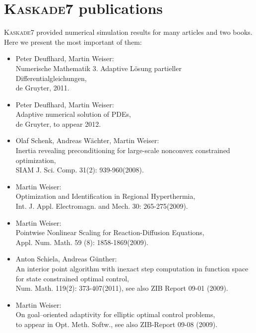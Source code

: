 \documentclass[11pt]{article}
\newcommand{\K}{\textsc{Kaskade7 }}
\begin{document}
\section{\K publications} \label{pubs}
\K provided numerical simulation results for  many  articles and  two books.
Here we present the most important of them:

\begin{itemize}
\item
Peter Deuflhard, Martin Weiser:\\
Numerische Mathematik 3. Adaptive L\"{o}sung partieller Differentialgleichungen,\\
de Gruyter, 2011.

\item
Peter Deuflhard, Martin Weiser:\\
Adaptive numerical solution of PDEs,\\
de Gruyter, to appear 2012.

\item
Olaf Schenk, Andreas W\"{a}chter, Martin Weiser: \\
Inertia revealing preconditioning for large-scale nonconvex constrained optimization,\\ 
SIAM J. Sci. Comp. 31(2): 939-960(2008).

\item
Martin Weiser: \\
Optimization and Identification in Regional Hyperthermia,\\
Int. J. Appl. Electromagn. and Mech. 30: 265-275(2009).

\item 
Martin Weiser: \\
Pointwise Nonlinear Scaling for Reaction-Diffusion Equations,\\
Appl. Num. Math. 59 (8): 1858-1869(2009).

\item
Anton Schiela, Andreas G\"unther: \\
An interior point algorithm with inexact step computation in function space for state constrained optimal control,\\
Num. Math. 119(2): 373-407(2011), see also ZIB Report 09-01 (2009).

\item 
Martin Weiser:\\
On goal--oriented adaptivity for elliptic optimal control problems,\\
to appear in Opt. Meth. Softw., see also ZIB-Report 09-08 (2009).


\end{itemize}
\end{document}
